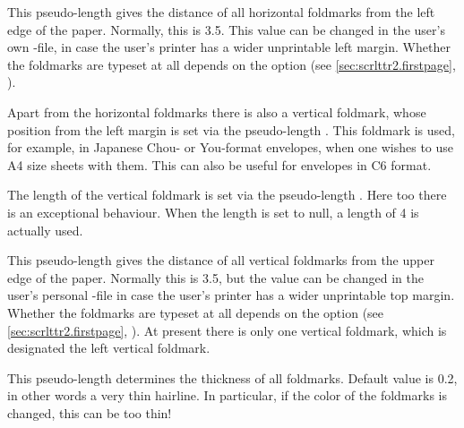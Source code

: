 \begin{Declaration}
\end{Declaration}
This pseudo-length gives the distance of all horizontal foldmarks from the
left edge of the paper. Normally, this is 3.5. This
value can be changed in the user's own -file, in case the user's
printer has a wider unprintable left margin. Whether the foldmarks are typeset
at all depends on the option %
 (see
\autoref{sec:scrlttr2.firstpage},
).
%
\EndIndexGroup


\begin{Declaration}
\end{Declaration}
Apart from the horizontal foldmarks there
is also a vertical foldmark, whose position from the left margin is set via
the pseudo-length . This foldmark is used, for example,
in Japanese Chou- or You-format envelopes, when one wishes to use A4 size
sheets with them. This can also be useful for envelopes in C6 format.%
\EndIndexGroup


\begin{Declaration}
\end{Declaration}
The length of the vertical foldmark is set
via the pseudo-length .  Here too there is an
exceptional behaviour. When the length is set to null, a length of 4
is actually used.%
\EndIndexGroup


\begin{Declaration}
\end{Declaration}
This pseudo-length gives the distance of
all vertical foldmarks from the upper edge of the paper. Normally this is
3.5, but the value can be changed in the user's
personal -file in case the user's printer has a wider unprintable
top margin.  Whether the foldmarks are typeset at all depends on the option
%
 (see
\autoref{sec:scrlttr2.firstpage},
). At present there is only one
vertical foldmark, which is designated the left vertical foldmark.
%
\EndIndexGroup


\begin{Declaration}
\end{Declaration}
This pseudo-length determines the
thickness of all foldmarks. Default value is 0.2, in other words a
very thin hairline. In particular, if the color of the foldmarks is
changed, this can be too thin!%
\EndIndexGroup
%
\EndIndexGroup


